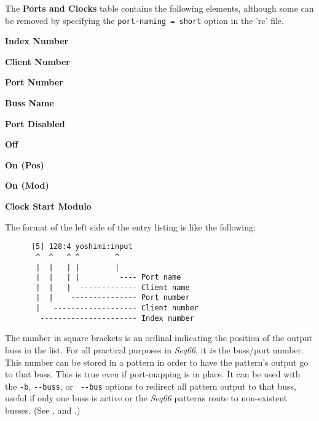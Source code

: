    The \textbf{Ports and Clocks} table contains the following elements,
   although some can be removed by specifying the
   \texttt{port-naming = short} option in the 'rc' file.

   \begin{enumber}
      \item \textbf{Index Number}
      \item \textbf{Client Number}
      \item \textbf{Port Number}
      \item \textbf{Buss Name}
      \item \textbf{Port Disabled}
      \item \textbf{Off}
      \item \textbf{On (Pos)}
      \item \textbf{On (Mod)}
      \item \textbf{Clock Start Modulo}
   \end{enumber}

   The format of the left side of the entry listing is like the following:

   \begin{verbatim}
      [5] 128:4 yoshimi:input
       ^  ^   ^ ^        ^
       |  |   | |        |
       |  |   | |         ---- Port name
       |  |   |  ------------- Client name
       |  |    --------------- Port number
       |   ------------------- Client number
        ---------------------- Index number
   \end{verbatim}

   \setcounter{ItemCounter}{0}      %

   The number in square brackets is an ordinal indicating the position
   of the output buss in the list.
   For all practical purposes in \textsl{Seq66}, it \textsl{is} the
   buss/port number.  This number can be stored in a pattern in order to have
   the pattern's output go to that buss.  
   This is true even if port-mapping is in place.
   It can be used with the \texttt{-b},
   \texttt{-{}-buss}, or \texttt{ -{}-bus} options to redirect all
   pattern output to that buss, useful if only one buss is active or the
   \textsl{Seq66} patterns route to non-existent busses.
   (See ,
   and .)

